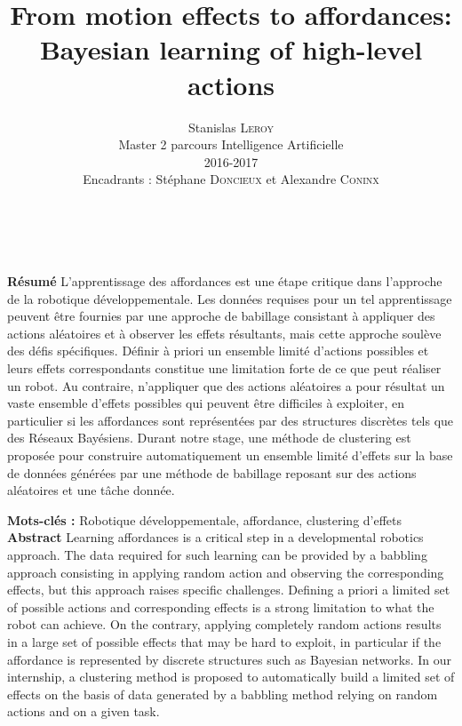 \documentclass{llncs}
\begin{document}
\title{From motion effects to affordances: Bayesian learning of high-level actions}

\author{Stanislas \textsc{Leroy}\\
   Master 2 parcours Intelligence Artificielle\\
   2016-2017\\
   Encadrants : Stéphane \textsc{Doncieux} et Alexandre \textsc{Coninx}}


\maketitle

\ \\\\\textbf{Résumé} L'apprentissage des affordances est une étape critique dans l'approche de la robotique développementale.
Les données requises pour un tel apprentissage peuvent être fournies par une approche de babillage consistant à appliquer des actions aléatoires et à observer les effets résultants, mais cette approche soulève des défis spécifiques.
Définir à priori un ensemble limité d'actions possibles et leurs effets correspondants constitue une limitation forte de ce que peut réaliser un robot.
Au contraire, n'appliquer que des actions aléatoires a pour résultat un vaste ensemble d'effets possibles qui peuvent être difficiles à exploiter, en particulier si les affordances sont représentées par des structures discrètes tels que des Réseaux Bayésiens.
Durant notre stage, une méthode de clustering est proposée pour construire automatiquement un ensemble limité d'effets sur la base de données générées par une méthode de babillage reposant sur des actions aléatoires et une tâche donnée.

\textbf{Mots-clés :} Robotique développementale, affordance, clustering d'effets\\


\textbf{Abstract} Learning affordances is a critical step in a developmental robotics approach.
The data required for such learning can be provided by a babbling approach consisting in applying random action and observing the corresponding effects, but this approach raises specific challenges.
Defining a priori a limited set of possible actions and corresponding effects is a strong limitation to what the robot can achieve.
On the contrary, applying completely random actions results in a large set of possible effects that may be hard to exploit, in particular if the affordance is represented by discrete structures such as Bayesian networks.
In our internship, a clustering method is proposed to automatically build a limited set of effects on the basis of data generated by a babbling method relying on random actions and on a given task.
\end{document}
